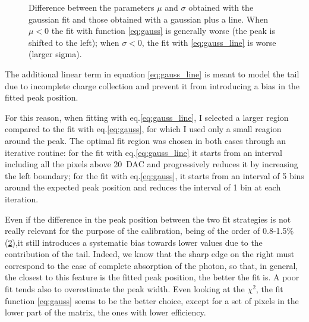 \begin{figure}
\begin{subfigure}[b]{0.49\textwidth}
                \caption{}
                \label{fig:delta_s}
            \end{subfigure}
            \caption{Difference between the parameters $\mu$ and $\sigma$ obtained with the gaussian fit and those obtained with a gaussian plus a line. When $\mu<$0 the fit with function \ref{eq:gauss} is generally worse (the peak is shifted to the left); when $\sigma<0$, the fit with \ref{eq:gauss_line} is worse (larger sigma). }
            \label{fig:delta_fit}
       \end{figure}        

        The additional linear term in equation \ref{eq:gauss_line} is meant to model the tail due to incomplete charge collection and prevent it from introducing a bias in the fitted peak position.

        For this reason, when fitting with eq.\ref{eq:gauss_line}, I selected a larger region compared to the fit with eq.\ref{eq:gauss}, for which I used only a small reagion around the peak. The optimal fit region was chosen in both cases through an iterative routine: for the fit with eq.\ref{eq:gauss_line} it starts from an interval including all the pixels above \SI{20}{DAC} and progressively reduces it by increasing the left boundary; for the fit with eq.\ref{eq:gauss}, it starts from an interval of 5 bins around the expected peak position and reduces the interval of 1 bin at each iteration.
    
        Even if the difference in the peak position between the two fit strategies is not really relevant for the purpose of the calibration, being of the order of 0.8-1.5\% (\ref{fig:delta_fit}),it still introduces a systematic bias towards lower values due to the contribution of the tail. 
        Indeed, we know that the sharp edge on the right must correspond to the case of complete absorption of the photon, so that, in general, the closest to this feature is the fitted peak position, the better the fit is. A poor fit tends also to overestimate the peak width.  
        Even looking at the $\chi^2$, the fit function \ref{eq:gauss} seems to be the better choice, except for a set of pixels in the lower part of the matrix, the ones with lower efficiency.

